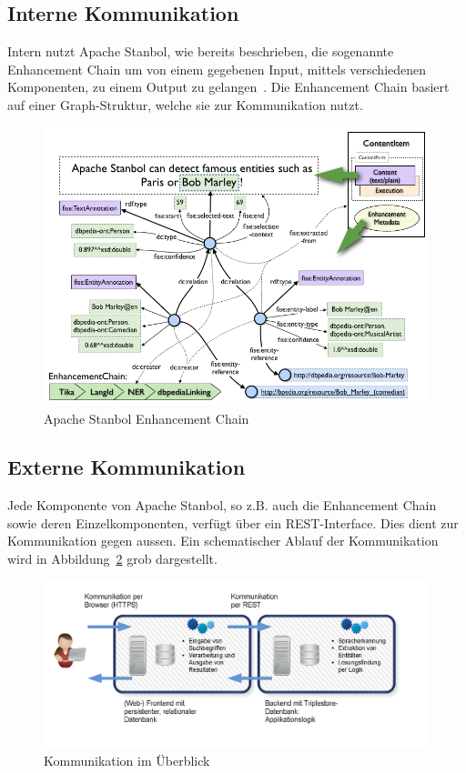 \subsection{Interne Kommunikation}
\label{sec:architektur_schnittstellen_intern}
Intern nutzt Apache Stanbol, wie bereits beschrieben, die sogenannte Enhancement Chain um von einem gegebenen Input, mittels verschiedenen Komponenten, zu einem Output zu gelangen~\cite{stanbol:enhancementchain}. Die Enhancement Chain basiert auf einer Graph-Struktur, welche sie zur Kommunikation nutzt.

\begin{figure}[H]
	\centering
    \includegraphics[scale=0.4]{bilder/enhancementstructure.png}
	\caption{Apache Stanbol Enhancement Chain\protect\footnotemark}
\label{fig:kommunikationKomponenten}
\end{figure}

\newpage

\subsection{Externe Kommunikation}
\label{sec:architektur_schnittstellen_extern}
Jede Komponente von Apache Stanbol, so z.B. auch die Enhancement Chain sowie deren Einzelkomponenten, verfügt über ein REST-Interface. Dies dient zur Kommunikation gegen aussen. Ein schematischer Ablauf der Kommunikation wird in Abbildung~\ref{fig:kommunikationKomponenten} grob dargestellt.

\begin{figure}[H]
	\centering
	\includegraphics[scale=0.4]{bilder/software_komponenten.png}
	\caption{Kommunikation im Überblick\protect\footnotemark}
\label{fig:kommunikationKomponenten}
\end{figure}
